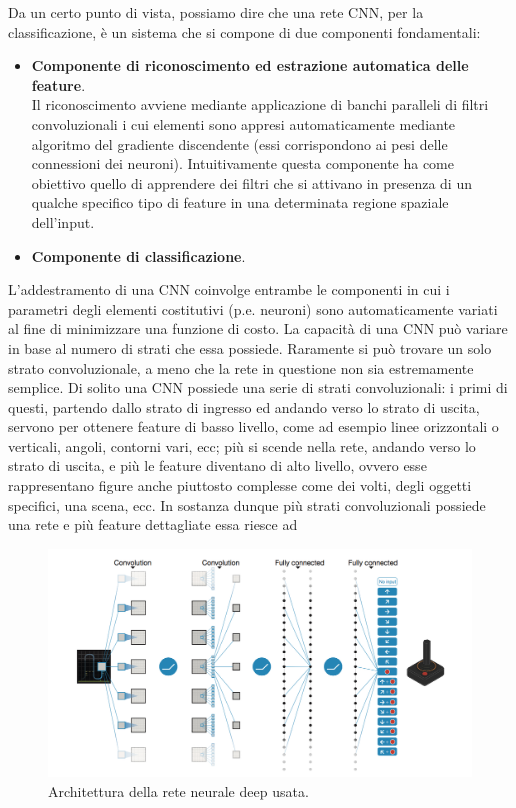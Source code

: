 \documentclass[twoside,twocolumn,10pt]{extarticle}
\theoremstyle{definition}
\begin{document}
Da un certo punto di vista, possiamo dire che una rete CNN, per la classificazione, è un sistema che si compone di due componenti fondamentali:
\begin{itemize}
	\item 
	\textbf{Componente di riconoscimento ed estrazione automatica delle feature}. \\Il riconoscimento avviene mediante applicazione di banchi paralleli di filtri convoluzionali i cui elementi sono appresi automaticamente mediante algoritmo del gradiente discendente (essi corrispondono ai pesi delle connessioni dei neuroni). Intuitivamente questa componente ha come obiettivo quello di apprendere dei filtri che si attivano in presenza di un qualche specifico tipo di feature in una determinata regione spaziale dell’input.
	\item
	\textbf{Componente di classificazione}.
\end{itemize}
L’addestramento di una CNN coinvolge entrambe le componenti in cui i parametri degli elementi costitutivi (p.e. neuroni) sono automaticamente variati al fine di minimizzare una funzione di costo.
La capacità di una CNN può variare in base al numero di strati che essa possiede. Raramente si può trovare un solo strato convoluzionale, a meno che la rete in questione non sia estremamente semplice. Di solito una CNN possiede una serie di strati convoluzionali: i primi di questi, partendo dallo strato di ingresso ed andando verso lo strato di uscita, servono per ottenere feature di basso livello, come ad esempio linee orizzontali o verticali, angoli, contorni vari, ecc; più si scende nella rete, andando verso lo strato di uscita, e più le feature diventano di alto livello, ovvero esse rappresentano figure anche piuttosto complesse come dei volti, degli oggetti specifici, una scena, ecc. In sostanza dunque più strati convoluzionali possiede una rete e più feature dettagliate essa riesce ad 

\begin{figure}[h]
	\centering
	\includegraphics[scale=.33]{images/cnnDQN.jpg}
	\caption{Architettura della rete neurale deep usata.}
	\label{fig:cnnDQN}
\end{figure}
\end{document}
